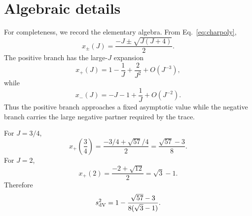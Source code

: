 \section{Algebraic details}
\label{app:algebra}

For completeness, we record the elementary algebra.  From Eq.~\eqref{eq:charpoly},
\begin{equation}
  x_\pm(J)=\frac{-J\pm\sqrt{J(J+4)}}{2}.
\end{equation}
The positive branch has the large-\(J\) expansion
\begin{equation}
  x_+(J)=1-\frac{1}{J}+\frac{2}{J^2}+O(J^{-3}),
\end{equation}
while
\begin{equation}
  x_-(J)=-J-1+\frac{1}{J}+O(J^{-2}).
\end{equation}
Thus the positive branch approaches a fixed asymptotic value while the negative branch carries the large negative partner required by the trace.

For \(J=3/4\),
\begin{equation}
  x_+\left(\frac34\right)=\frac{-3/4+\sqrt{57}/4}{2}=\frac{\sqrt{57}-3}{8}.
\end{equation}
For \(J=2\),
\begin{equation}
  x_+(2)=\frac{-2+\sqrt{12}}{2}=\sqrt{3}-1.
\end{equation}
Therefore
\begin{equation}
  s^2_{\rm dV}=1-\frac{\sqrt{57}-3}{8(\sqrt3-1)}.
\end{equation}
